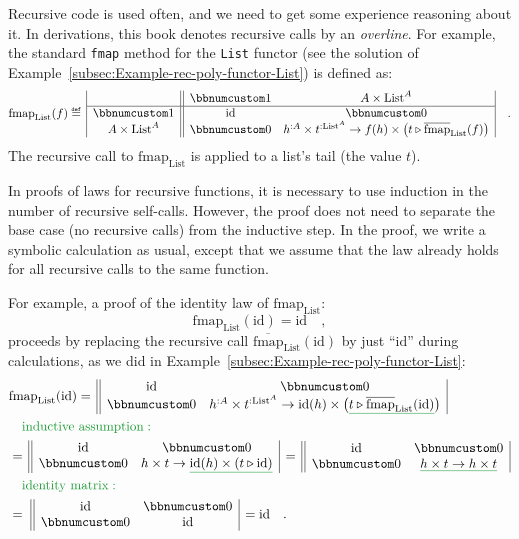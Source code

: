 Recursive code is used often, and we need to get some experience reasoning
about it. In derivations, this book denotes recursive calls by an
\emph{overline}. For example, the standard \lstinline!fmap! method
for the \lstinline!List! functor (see the solution of Example~\ref{subsec:Example-rec-poly-functor-List})
is defined as:
\[
\text{fmap}_{\text{List}}(f)\triangleq\,\begin{array}{|c||cc|}
 & \bbnum 1 & A\times\text{List}^{A}\\
\hline \bbnum 1 & \text{id} & \bbnum 0\\
A\times\text{List}^{A} & \bbnum 0 & h^{:A}\times t^{:\text{List}^{A}}\rightarrow f(h)\times\big(t\triangleright\overline{\text{fmap}}_{\text{List}}(f)\big)
\end{array}\quad.
\]
The recursive call to $\text{fmap}_{\text{List}}$ is applied to a
list\textsf{'}s tail (the value $t$).

In proofs of laws for recursive functions, it is necessary to use
induction in the number of recursive self-calls. However, the proof
does not need to separate the base case (no recursive calls) from
the inductive step. In the proof, we write a symbolic calculation
as usual, except that we assume that the law already holds for all
recursive calls to the same function.

For example, a proof of the identity law of $\text{fmap}_{\text{List}}$:
\[
\text{fmap}_{\text{List}}(\text{id})=\text{id}\quad,
\]
proceeds by replacing the recursive call $\overline{\text{fmap}}_{\text{List}}(\text{id})$
by just \textsf{``}$\text{id}$\textsf{''} during calculations, as we did in Example~\ref{subsec:Example-rec-poly-functor-List}:
\begin{align*}
 & \text{fmap}_{\text{List}}(\text{id})=\,\begin{array}{||cc|}
\text{id} & \bbnum 0\\
\bbnum 0 & h^{:A}\times t^{:\text{List}^{A}}\rightarrow\text{id}(h)\times\big(\gunderline{t\triangleright\overline{\text{fmap}}_{\text{List}}(\text{id})}\big)
\end{array}\\
 & \quad{\color{greenunder}\text{inductive assumption}:}\quad\\
 & =\,\begin{array}{||cc|}
\text{id} & \bbnum 0\\
\bbnum 0 & h\times t\rightarrow\gunderline{\text{id}(h)\times(t\triangleright\text{id})}
\end{array}\,=\,\begin{array}{||cc|}
\text{id} & \bbnum 0\\
\bbnum 0 & \gunderline{h\times t\rightarrow h\times t}
\end{array}\\
 & \quad{\color{greenunder}\text{identity matrix}:}\quad\\
 & =\,\,\begin{array}{||cc|}
\text{id} & \bbnum 0\\
\bbnum 0 & \text{id}
\end{array}\,=\text{id}\quad.
\end{align*}



